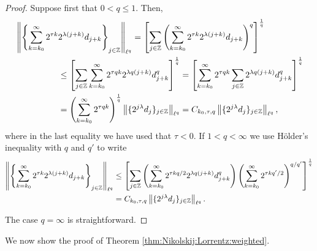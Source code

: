 \begin{proof}
Suppose first that $0 < q \leq 1$. Then,
\begin{align*}
& \left\|\left\{\sum_{k=k_0}^\infty 2^{\tau k} 2^{\lambda(j+k)}d_{j+k}\right\}_{j\in \mathbb{Z}}\right\|_{\ell^q} = \left[\sum_{j \in \mathbb{Z}} \left( \sum_{k=k_0}^\infty 2^{\tau k} 2^{\lambda(j+k)}d_{j+k} \right)^q \right]^\frac{1}{q}\\
& \quad\quad\quad\quad\quad \leq  \left[\sum_{j \in \mathbb{Z}}  \sum_{k=k_0}^\infty 2^{\tau q k} 2^{\lambda q (j+k)}d_{j+k}^q \right]^\frac{1}{q} =  \left[ \sum_{k=k_0}^\infty  2^{\tau q k} \sum_{j \in \mathbb{Z}} 2^{\lambda q (j+k)}d_{j+k}^q \right]^\frac{1}{q}\\
&  \quad\quad\quad \quad \quad = \left(  \sum_{k=k_0}^\infty   2^{\tau q k}     \right)^\frac{1}{q} \left\|\{2^{j \lambda} d_j\}_{j\in \mathbb{Z}}\right\|_{\ell^q} = C_{k_0, \tau, q} \left\|\{2^{j \lambda} d_j\}_{j\in\mathbb{Z}}\right\|_{\ell^q},
\end{align*}
where in the last equality we have used that $\tau < 0$. If $1 < q < \infty$ we use H\"older's inequality with $q$ and $q'$ to write
\begin{align*}
 \left\|\left\{\sum_{k=k_0}^\infty 2^{\tau k} 2^{\lambda(j+k)}d_{j+k}\right\}_{j\in\mathbb{Z}}\right\|_{\ell^q} 
& \le \left[\sum_{j \in \mathbb{Z}}   \left(\sum_{k=k_0}^\infty 2^{\tau k q/2} 2^{\lambda q(j+k)}d_{j+k}^q \right)     \left( \sum_{k=k_0}^\infty 2^{\tau kq'/2} \right)^{q/q'}   \right]^\frac{1}{q}\\
&    =C_{k_0, \tau, q} \left\|\{2^{j \lambda} d_j\}_{j\in\mathbb{Z}}\right\|_{\ell^q}.
\end{align*}

The case $q = \infty$ is straightforward.
\end{proof}

We now show the proof of Theorem \ref{thm:Nikolskij:Lorrentz:weighted}.

